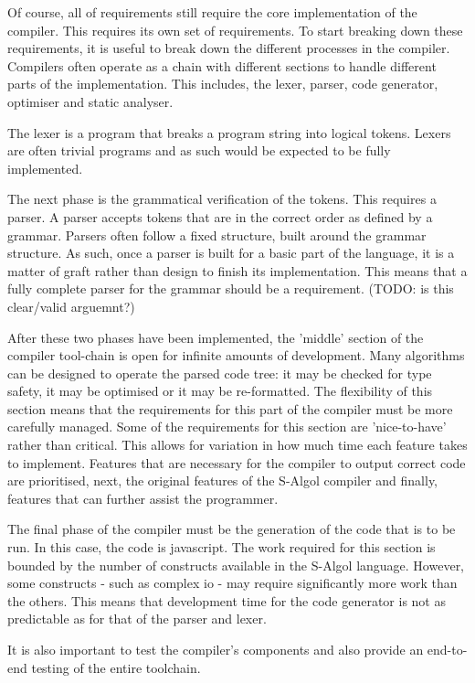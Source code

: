 \documentclass{article}
\begin{document}
Of course, all of requirements still require the core implementation of the compiler. This requires its own set of requirements. To start breaking down these requirements, it is useful to break down the different processes in the compiler. Compilers often operate as a chain with different sections to handle different parts of the implementation. This includes, the lexer, parser, code generator, optimiser and static analyser.

The lexer is a program that breaks a program string into logical tokens. Lexers are often trivial programs and as such would be expected to be fully implemented.

The next phase is the grammatical verification of the tokens. This requires a parser. A parser accepts tokens that are in the correct order as defined by a grammar. Parsers often follow a fixed structure, built around the grammar structure. As such, once a parser is built for a basic part of the language, it is a matter of graft rather than design to finish its implementation. This means that a fully complete parser for the grammar should be a requirement. (TODO: is this clear/valid arguemnt?)

After these two phases have been implemented, the 'middle' section of the compiler tool-chain is open for infinite amounts of development. Many algorithms can be designed to operate the parsed code tree: it may be checked for type safety, it may be optimised or it may be re-formatted. The flexibility of this section means that the requirements for this part of the compiler must be more carefully managed. Some of the requirements for this section are 'nice-to-have' rather than critical. This allows for variation in how much time each feature takes to implement. Features that are necessary for the compiler to output correct code are prioritised, next, the original features of the S-Algol compiler and finally, features that can further assist the programmer.

The final phase of the compiler must be the generation of the code that is to be run. In this case, the code is javascript. The work required for this section is bounded by the number of constructs available in the S-Algol language. However, some constructs - such as complex io - may require significantly more work than the others. This means that development time for the code generator is not as predictable as for that of the parser and lexer.

It is also important to test the compiler's components and also provide an end-to-end testing of the entire toolchain.
\end{document}
